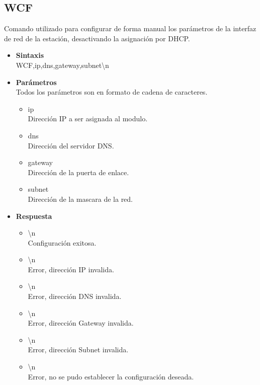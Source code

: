 \documentclass[a4paper,spanish]{article}
\begin{document}
\subsection{WCF}
Comando utilizado para configurar de forma manual los parámetros de la interfaz de red de la estación, desactivando la asignación por DHCP. 
\begin{itemize}
	\item \textbf{Sintaxis}\\
	{\ttfamily WCF,ip,dns,gateway,subnet\textbackslash n}
	\item \textbf{Parámetros}\\
	Todos los parámetros son en formato de cadena de caracteres. 
	\begin{itemize}
		\item{\ttfamily ip}\\
		Dirección IP a ser asignada al modulo. 
		\item{\ttfamily dns}\\
		Dirección del servidor DNS.
		\item{\ttfamily gateway}\\
		Dirección de la puerta de enlace.
		\item{\ttfamily subnet}\\
		Dirección de la mascara de la red.
	\end{itemize}
	\item \textbf{Respuesta}
	\begin{itemize}
		\item{\textbackslash n} \\
		Configuración exitosa.
		\item{\textbackslash n} \\
		Error, dirección IP invalida.
		\item{\textbackslash n} \\
		Error, dirección DNS invalida.
		\item{\textbackslash n} \\
		Error, dirección Gateway invalida.
		\item{\textbackslash n} \\
		Error, dirección Subnet invalida.
		\item{\textbackslash n} \\
		Error, no se pudo establecer la configuración deseada. 
	\end{itemize}
\end{itemize}
\end{document}
